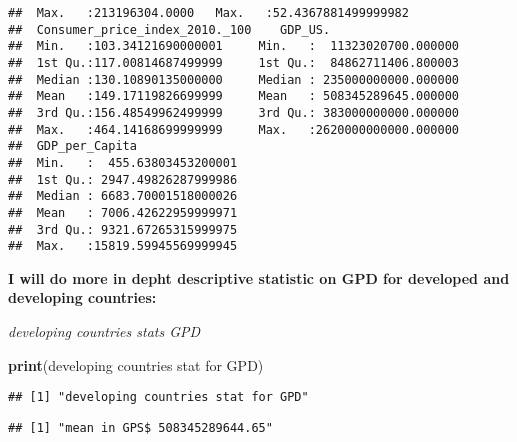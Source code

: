 \documentclass[
]{article}
\newenvironment{Shaded}{\begin{snugshade}}{\end{snugshade}}
\newcommand{\FunctionTok}[1]{\textcolor[rgb]{0.13,0.29,0.53}{\textbf{#1}}}
\newcommand{\NormalTok}[1]{#1}
\newcommand{\SpecialCharTok}[1]{\textcolor[rgb]{0.81,0.36,0.00}{\textbf{#1}}}
\newcommand{\StringTok}[1]{\textcolor[rgb]{0.31,0.60,0.02}{#1}}
\begin{document}
\begin{verbatim}
##  Max.   :213196304.0000   Max.   :52.4367881499999982  
##  Consumer_price_index_2010._100    GDP_US.                    
##  Min.   :103.34121690000001     Min.   :  11323020700.000000  
##  1st Qu.:117.00814687499999     1st Qu.:  84862711406.800003  
##  Median :130.10890135000000     Median : 235000000000.000000  
##  Mean   :149.17119826699999     Mean   : 508345289645.000000  
##  3rd Qu.:156.48549962499999     3rd Qu.: 383000000000.000000  
##  Max.   :464.14168699999999     Max.   :2620000000000.000000  
##  GDP_per_Capita                
##  Min.   :  455.63803453200001  
##  1st Qu.: 2947.49826287999986  
##  Median : 6683.70001518000026  
##  Mean   : 7006.42622959999971  
##  3rd Qu.: 9321.67265315999975  
##  Max.   :15819.59945569999945
\end{verbatim}

\textbf{I will do more in depht descriptive statistic on GPD for
developed and developing countries:}

\emph{developing countries stats GPD}

\begin{Shaded}
\begin{Highlighting}[]
\FunctionTok{print}\NormalTok{(}\StringTok{\textquotesingle{}developing countries stat for GPD\textquotesingle{}}\NormalTok{)}
\end{Highlighting}
\end{Shaded}

\begin{verbatim}
## [1] "developing countries stat for GPD"
\end{verbatim}

\begin{Shaded}
\end{Shaded}

\begin{verbatim}
## [1] "mean in GPS$ 508345289644.65"
\end{verbatim}

\begin{Shaded}
\end{Shaded}
\end{document}
